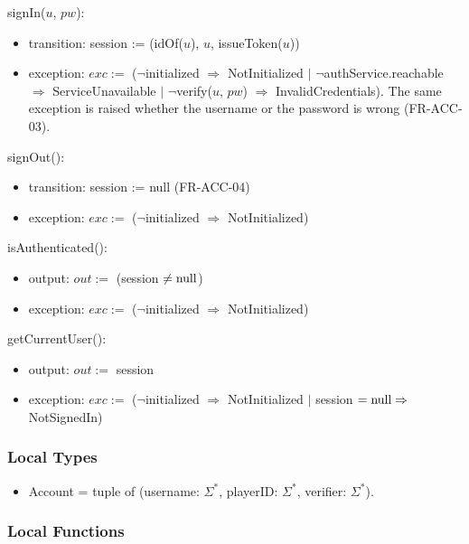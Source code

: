 \documentclass[12pt, titlepage]{article}
\newcommand{\nul}{\textnormal{null}}
\newcommand{\noinit}{$\neg$initialized $\Rightarrow$ NotInitialized}
\begin{document}
\noindent signIn($u$, $pw$):
\begin{itemize}
\item transition: session := (idOf($u$), $u$, issueToken($u$))
\item exception: $exc :=$ (\noinit{} $|$ $\neg$authService.reachable
  $\Rightarrow$ ServiceUnavailable $|$ $\neg$verify($u$, $pw$) $\Rightarrow$
  InvalidCredentials). The same exception is raised whether the username or
  the password is wrong (FR-ACC-03).
\end{itemize}

\noindent signOut():
\begin{itemize}
\item transition: session := \nul{} (FR-ACC-04)
\item exception: $exc :=$ (\noinit)
\end{itemize}

\noindent isAuthenticated():
\begin{itemize}
\item output: $out :=$ (session $\neq \nul$)
\item exception: $exc :=$ (\noinit)
\end{itemize}

\noindent getCurrentUser():
\begin{itemize}
\item output: $out :=$ session
\item exception: $exc :=$ (\noinit{} $|$ session $= \nul \Rightarrow$
  NotSignedIn)
\end{itemize}

\subsubsection{Local Types}

\begin{itemize}
\item Account = tuple of (username: $\Sigma^*$, playerID: $\Sigma^*$,
  verifier: $\Sigma^*$).
\end{itemize}

\subsubsection{Local Functions}
\end{document}
